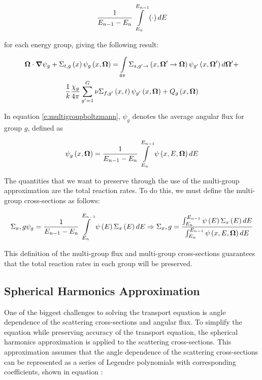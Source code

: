 \begin{equation}
\frac{1}{E_{n-1} - E_n}\intop_{E_n}^{E_{n-1}}\left(\cdot\right)dE
\end{equation}

for each energy group, giving the following result:

\begin{gather}
\bm \Omega \cdot \bm \nabla \psi_g + \Sigma_{t,g}\left(x\right)\psi_g\left(x,\bm \Omega\right) = \intop_{4\pi} \Sigma_{s,g'\rightarrow}\left(x,\bm \Omega' \rightarrow \bm \Omega\right) \psi_{g'}\left(x,\bm \Omega'\right) d\bm \Omega' + \nonumber\\
\frac{1}{k}\frac{\chi_g}{4\pi} \sum_{g'=1}^{G} \nu \Sigma_{f,g'}\left(x,t\right) \psi_{g'}\left(x,\bm \Omega\right) + Q_g\left(x,\bm \Omega\right)\label{e:multigroupboltzmann}
\end{gather}

In equation \ref{e:multigroupboltzmann}, $\psi_g$ denotes the average angular flux for group $g$, defined as

\begin{equation}\label{e:multigroupangflux}
\psi_g\left(x,\bm \Omega\right)=\frac{1}{E_{n-1}-E_n} \intop_{E_n}^{E_{n-1}} \psi\left(x,E,\bm\Omega\right) dE
\end{equation}

The quantities that we want to preserve through the use of the multi-group approximation are the total reaction rates.  To do this, we must define the multi-group cross-sections as follows:

\begin{equation}\label{e:multigroupXS}
\Sigma_x,g \psi_g = \frac{1}{E_{n-1}-E_n} \intop_{E_n}^{E_{n-1}} \psi\left(E\right) \Sigma_x\left(E\right) dE \Rightarrow \Sigma_x,g = \frac{\intop_{E_n}^{E_{n-1}} \psi\left(E\right) \Sigma_x\left(E\right) dE}{\intop_{E_n}^{E_{n-1}} \psi\left(x,E,\bm\Omega\right) dE}
\end{equation}

This definition of the multi-group flux and multi-group cross-sections guarantees that the total reaction rates in each group will be preserved.


\subsection{Spherical Harmonics Approximation}

One of the biggest challenges to solving the transport equation is angle dependence of the scattering cross-sections and angular flux.  To simplify the equation while preserving accuracy of the transport equation, the spherical harmonics approximation is applied to the scattering cross-sections.  This approximation assumes that the angle dependence of the scattering cross-sections can be represented as a series of Legendre polynomials with corresponding coefficients, shown in equation :

